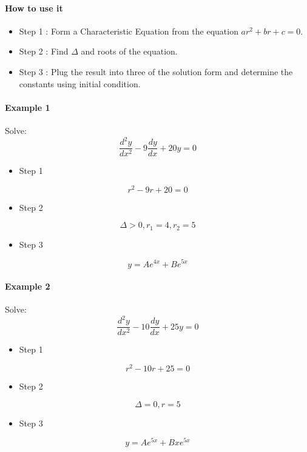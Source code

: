 \begin{tcolorbox}[title=Method,breakable]
	\paragraph{How to use it}
	\begin{itemize}
		\item Step 1 : Form a Characteristic Equation from the equation \(ar^2 + br + c =0\).
		\item Step 2 : Find \(\Delta\) and roots of the equation.
		\item Step 3 : Plug the result into three of the solution form and determine the constants using initial condition.
	\end{itemize}
\end{tcolorbox}

\paragraph{Example 1} Solve:
\[
\frac{d^2y}{dx^2} -9\frac{dy}{dx} + 20 y = 0
\]
\begin{itemize}
	\item Step 1
\end{itemize}
\[
r^2 -9r + 20 =0
\]
\begin{itemize}
	\item Step 2
\end{itemize}
\[
\Delta > 0, r_1 = 4, r_2 = 5
\]
\begin{itemize}
	\item Step 3
\end{itemize}
\[
y = Ae^{4x} + Be^{5x}
\]

\paragraph{Example 2} Solve:
\[
\frac{d^2y}{dx^2} -10\frac{dy}{dx} + 25 y = 0
\]
\begin{itemize}
	\item Step 1
\end{itemize}
\[
r^2 -10r + 25 =0
\]
\begin{itemize}
	\item Step 2
\end{itemize}
\[
\Delta = 0, r = 5
\]
\begin{itemize}
	\item Step 3
\end{itemize}
\[
y = Ae^{5x} + Bxe^{5x}
\]


